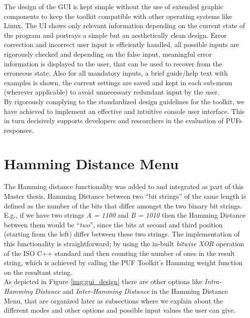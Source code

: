 The design of the GUI is kept simple without the use of extended graphic components to keep the toolkit compatible with other operating systems like Linux. The UI shows only relevant information depending on the current state of the program and portrays a simple but an aesthetically clean design. Error correction and incorrect user input is efficiently handled, all possible inputs are rigorously checked and depending on the false input, meaningful error information is displayed to the user, that can be used to
recover from the erroneous state. Also for all mandatory inputs, a brief guide/help text with examples is shown, the current settings are saved and kept in each sub-menu (wherever applicable) to avoid unnecessary redundant input by the user.\\

By rigorously complying to the standardized design guidelines for the toolkit, we have achieved to implement an effective and intuitive console user interface. This in turn decisively supports developers and researchers in the evaluation of PUFs responses.\cite{71}


\section{Hamming Distance Menu}
\label{Hamming_Distance_menu}
The Hamming distance functionality was added to and integrated as part of this Master thesis. Hamming Distance between two ``bit strings'' of the same length is defined as the number of the bits that differ amongst the two binary bit strings. E.g., if we have two strings \emph{A = 1100} and \emph{B = 1010} then the Hamming Distance between them would be ``\emph{two}'', since the bits at second and third position (starting from the left) differ between these two strings. The implementation of
this functionality is straightforward; by using the in-built \emph{bitwise XOR} operation of the ISO C++ standard and then counting the number of ones in the result string, which is achieved by calling the PUF Toolkit's Hamming weight function on the resultant string.\\

As depicted in Figure \ref{img:gui_design} there are other options like \emph{Intra-Hamming Distance} and \emph{Inter-Hamming Distance} in the Hamming Distance Menu, that are organized later as subsections where we explain about the different modes and other options and possible input values the user can give.\\

